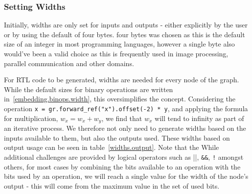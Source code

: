 \subsubsection{Setting Widths}
Initially, widths are only set for inputs and outputs \hyphen{} either explicitly by the user or by using the default of four bytes. four bytes was chosen as this is the default size of an integer in most programming languages, however a single byte also would've been a valid choice as this is frequently used in image processing, parallel communication and other domains.

For RTL code to be generated, widths are needed for every node of the graph. While the default sizes for binary operations are written in \ref{embedding.binops.width}, this oversimplifies the concept. Considering the operation \lstinline|x = gr.forward_ref("x").offset(-2) * y|, and applying the formula for multiplication, $w_x = w_x + w_y$, we find that $w_x$ will tend to infinity as part of an iterative process. We therefore not only need to generate widths based on the inputs available to them, but also the outputs used. These widths based on output usage can be seen in table \ref{widths.output}. Note that the  While additional challenges are provided by logical operators such as \lstinline||||, \lstinline|&&|, \lstinline|!| amongst others, for most cases by combining the bits available to an operation with the bits used by an operation, we will reach a single value for the width of the node's output \hyphen{} this will come from the maximum value in the set of used bits.


